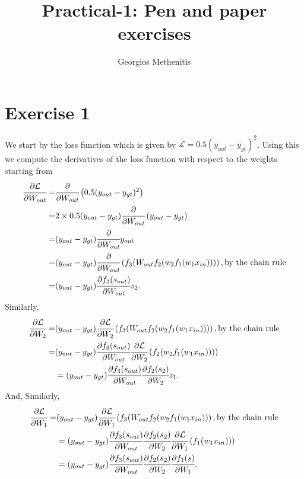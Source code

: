 \documentclass[10pt]{article}
\title{Practical-1: Pen and paper exercises}
\author{Georgios Methenitis}
\begin{document}
\maketitle


\section*{Exercise 1}

We start by the loss function which is given by $\mathcal{L} = 0.5 (y_{out} - y_{gt})^2$.
Using this we compute the derivatives of the loss function with respect to the weights starting from
\begin{align*}
\cfrac{\partial \mathcal{L}}{\partial W_{out}} =& \cfrac{\partial}{\partial W_{out}} \left( 0.5 (y_{out} - y_{gt})^2 \right)\\
=& 2 \times 0.5 (y_{out} - y_{gt}) \cfrac{\partial}{\partial W_{out}} \left( y_{out} - y_{gt} \right)\\
=& (y_{out} - y_{gt}) \cfrac{\partial}{\partial W_{out}}y_{out}\\
=& (y_{out} - y_{gt}) \cfrac{\partial}{\partial W_{out}} \left( f_3 ( W_{out} f_2(w_2 f_1 (w_1 x_{in}))) \right), \text{by the chain rule}\\
=& (y_{out} - y_{gt}) \cfrac{\partial f_3 (s_{out})}{\partial W_{out}} z_2.
\end{align*}
Similarly,
\begin{align*}
\cfrac{\partial \mathcal{L}}{\partial W_2} =& (y_{out} - y_{gt})  \cfrac{\partial \mathcal{L}}{\partial W_2} \left( f_3 ( W_{out} f_2(w_2 f_1 (w_1 x_{in}))) \right), \text{by the chain rule}\\
=&  (y_{out} - y_{gt}) \cfrac{\partial f_3 (s_{out})}{\partial W_{out}} \cfrac{\partial \mathcal{L}}{\partial W_2} \left( f_2(w_2 f_1 (w_1 x_{in}))) \right)\\
&= (y_{out} - y_{gt}) \cfrac{\partial f_3 (s_{out})}{\partial W_{out}} \cfrac{\partial f_2 (s_2)}{\partial W_2} z_1.
\end{align*}
And,
Similarly,
\begin{align*}
\cfrac{\partial \mathcal{L}}{\partial W_1} =& (y_{out} - y_{gt})  \cfrac{\partial \mathcal{L}}{\partial W_1} \left( f_3 ( W_{out} f_2(w_2 f_1 (w_1 x_{in})) \right), \text{by the chain rule}\\
&= (y_{out} - y_{gt}) \cfrac{\partial f_3 (s_{out})}{\partial W_{out}} \cfrac{\partial f_2 (s_2)}{\partial W_2} \cfrac{\partial \mathcal{L}}{\partial W_1} \left(f_1 (w_1 x_{in})) \right)\\
&= (y_{out} - y_{gt}) \cfrac{\partial f_3 (s_{out})}{\partial W_{out}} \cfrac{\partial f_2 (s_2)}{\partial W_2} \cfrac{\partial f_1 (s)}{\partial W_1}.
\end{align*}
\end{document}
